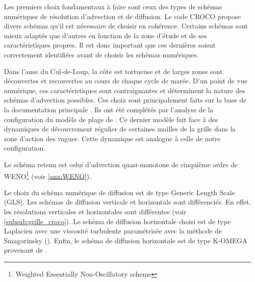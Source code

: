 \documentclass[10pt,a4paper,titlepage]{article}
\begin{document}
Les premiers choix fondamentaux à faire sont ceux des types de schémas numériques de résolution d'advection et de diffusion.
Le code CROCO propose divers schémas qu'il est nécessaire de choisir en cohérence. %
Certains schémas sont mieux adaptés que d'autres en fonction de la zone d'étude et de ses caractéristiques propres.
Il est donc important que ces dernières soient correctement identifiées avant de choisir les schémas numériques.

Dans l'anse du Cul-de-Loup, la côte est tortueuse et de larges zones sont découvertes et recouvertes au cours de chaque cycle de marée.
D'un point de vue numérique, ces caractéristiques sont contraignantes et déterminent la nature des schémas d'advection possibles.
Ces choix sont principalement faits sur la base de la documentation principale \parencite{cppkeys_description}.
Ils ont été complétés par l'analyse de la configuration du modèle de plage de  \cite{swash_article_MARCHESIELLO2021101816}.
Ce dernier modèle fait face à des dynamiques de découvrement régulier de certaines mailles de la grille dans la zone d'action des vagues.
Cette dynamique est analogue à celle de notre configuration.

Le schéma retenu est celui d'advection quasi-monotone de cinquième ordre de WENO\footnote{Weighted Essentially Non-Oscillatory scheme} (voir \ref{anx:WENO}).

Le choix du schéma numérique de diffusion est de type Generic Length Scale (GLS).
Les schémas de diffusion verticale et horizontale sont différenciés.
En effet, les résolutions verticales et horizontales sont différentes (voir \ref{subsub:grille_croco}).
Le schéma de diffusion horizontale choisi est de type Laplacien avec une viscosité turbulente paramétrisée avec la méthode de Smagorinsky (\cite{schemas_diffusion_horizontale}).
Enfin, le schéma de diffusion horizontale est de type K-OMEGA provenant de \cite{GLS_KOMEGA_kolmogorov1941equations}.
\end{document}
